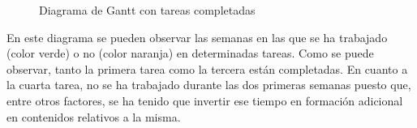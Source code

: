 \begin{figure}[H]
	{\fontsize{3}{4}\selectfont
		\centering
    	\def\svgscale{0.185}
    	
    	\caption{Diagrama de Gantt con tareas completadas}
    	\label{trabajo_realizado}
	}
\end{figure}

En este diagrama se pueden observar las semanas en las que se ha trabajado (color verde) o no (color naranja) en determinadas tareas. Como se puede observar, tanto la primera tarea como la tercera están completadas. En cuanto a la cuarta tarea, no se ha trabajado durante las dos primeras semanas puesto que, entre otros factores, se ha tenido que invertir ese tiempo en formación adicional en contenidos relativos a la misma.

